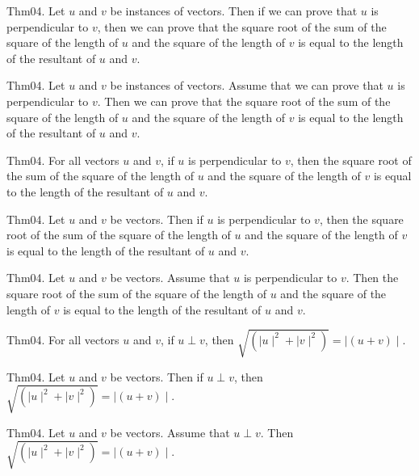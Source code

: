 \documentclass{article}
\begin{document}
Thm04. Let $u$ and $v$ be instances of vectors. Then if we can prove that $u$ is perpendicular to $v$, then we can prove that the square root of the sum of the square of the length of $u$ and the square of the length of $v$ is equal to the length of the resultant of $u$ and $v$.

Thm04. Let $u$ and $v$ be instances of vectors. Assume that we can prove that $u$ is perpendicular to $v$. Then we can prove that the square root of the sum of the square of the length of $u$ and the square of the length of $v$ is equal to the length of the resultant of $u$ and $v$.

Thm04. For all vectors $u$ and $v$, if $u$ is perpendicular to $v$, then the square root of the sum of the square of the length of $u$ and the square of the length of $v$ is equal to the length of the resultant of $u$ and $v$.

Thm04. Let $u$ and $v$ be vectors. Then if $u$ is perpendicular to $v$, then the square root of the sum of the square of the length of $u$ and the square of the length of $v$ is equal to the length of the resultant of $u$ and $v$.

Thm04. Let $u$ and $v$ be vectors. Assume that $u$ is perpendicular to $v$. Then the square root of the sum of the square of the length of $u$ and the square of the length of $v$ is equal to the length of the resultant of $u$ and $v$.

Thm04. For all vectors $u$ and $v$, if $u \perp v$, then $\sqrt{ (\mid u \mid ^{ 2}+ \mid v \mid ^{ 2})}= \mid (u + v)\mid$.

Thm04. Let $u$ and $v$ be vectors. Then if $u \perp v$, then $\sqrt{ (\mid u \mid ^{ 2}+ \mid v \mid ^{ 2})}= \mid (u + v)\mid$.

Thm04. Let $u$ and $v$ be vectors. Assume that $u \perp v$. Then $\sqrt{ (\mid u \mid ^{ 2}+ \mid v \mid ^{ 2})}= \mid (u + v)\mid$.
\end{document}
